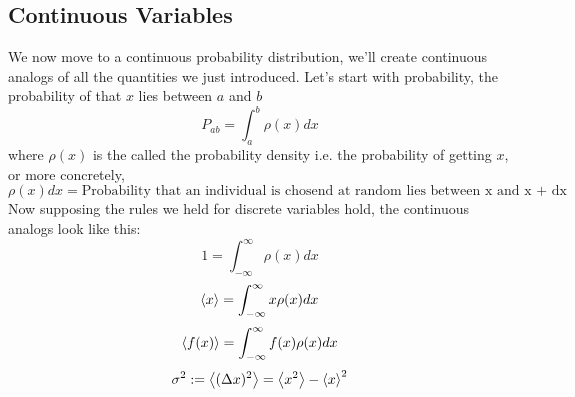 \subsection{Continuous Variables}
We now move to a continuous probability distribution, we'll create continuous analogs of all the quantities we just introduced. Let's start with probability, the probability of that $x$ lies between $a$ and $b$
\begin{equation}
	P_{ab} = \int_{a}^{b} \rho(x) dx
\end{equation}
where $\rho(x)$ is the called the probability density i.e. the probability of getting $x$, or more concretely,
$$\rho(x)dx = \text{Probability that an individual is chosend at random lies between x and x + dx}$$
Now supposing the rules we held for discrete variables hold, the continuous analogs look like this:
\begin{equation}
	1 = \int_{- \infty}^{\infty} \rho(x) dx
\end{equation}
\begin{equation}
	\expval{x} = \int_{- \infty}^{\infty} x \rho(x) dx
\end{equation}
\begin{equation}
	\expval{f(x)} = \int_{- \infty}^{\infty} f(x) \rho(x) dx
\end{equation}
\begin{equation}
	\sigma^{2} := \expval{(\Delta x)^{2}} = \expval{x^{2}} - {\expval{x}}^{2}
\end{equation}
